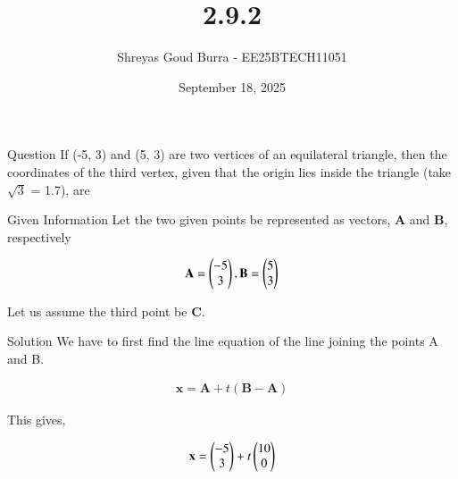 \documentclass{beamer}
\title %
{2.9.2}
\date{September 18, 2025}
\author 
{Shreyas Goud Burra - EE25BTECH11051}
\begin{document}
\frame{\titlepage}

\begin{frame}{Question}
    If (-5, 3) and (5, 3) are two vertices of an equilateral triangle, then the
coordinates of the third vertex, given that the origin lies inside the triangle (take $\sqrt{3}$ = 1.7), are
\end{frame}

\begin{frame}{Given Information}
    Let the two given points be represented as vectors, \textbf{A} and \textbf{B}, respectively

\begin{align}
    \textbf{A} = \begin{pmatrix}-5\\3\end{pmatrix}, \textbf{B} = \begin{pmatrix}5\\3\end{pmatrix}
    \label{0.1}
\end{align}

Let us assume the third point be \textbf{C}.\\
\end{frame}

\begin{frame}{Solution}
We have to first find the line equation of the line joining the points A and B.

\begin{align}
    \textbf{x} = \textbf{A} + t(\textbf{B}-\textbf{A})
    \label{0.2}
\end{align}

This gives,

\begin{align}
    \textbf{x} = \begin{pmatrix}-5\\3\end{pmatrix}+t\begin{pmatrix}10\\0\end{pmatrix}
    \label{0.3}
\end{align}

\end{frame}
\end{document}
